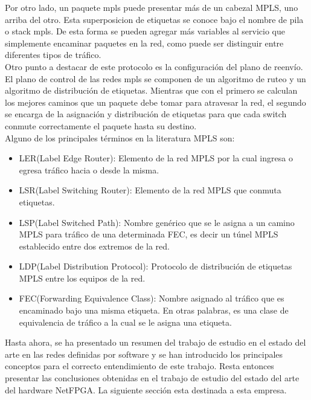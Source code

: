 Por otro lado, un paquete mpls puede presentar más de un cabezal MPLS, uno arriba del otro. Esta superposicion de etiquetas se conoce bajo el nombre de pila o stack mpls. De esta forma se pueden agregar más variables al servicio que simplemente encaminar paquetes en la red, como puede ser distinguir entre diferentes tipos de tráfico.\\

Otro punto a destacar de este protocolo es la configuración del plano de reenvío. El plano de control de las redes mpls se componen de un algoritmo de ruteo y un algoritmo de distribución de etiquetas. Mientras que con el primero se calculan los mejores caminos que un paquete debe tomar para atravesar la red, el segundo se encarga de la asignación y distribución de etiquetas para que cada switch conmute correctamente el paquete hasta su destino.\\

Alguno de los principales términos en la literatura MPLS son:

\begin{itemize}
\item LER(Label Edge Router): Elemento de la red MPLS por la cual ingresa o egresa tráfico hacia o desde la misma.
\item LSR(Label Switching Router): Elemento de la red MPLS que conmuta etiquetas.
\item LSP(Label Switched Path): Nombre genérico que se le asigna a un camino MPLS para tráfico de una determinada FEC, es decir un túnel MPLS establecido entre dos extremos de la red.
\item LDP(Label Distribution Protocol): Protocolo de distribución de etiquetas MPLS entre los equipos de la red.
\item FEC(Forwarding Equivalence Class): Nombre asignado al tráfico que es encaminado bajo una misma etiqueta. En otras palabras, es una clase de equivalencia de tráfico a la cual se le asigna una etiqueta.
 
\end{itemize}
\vspace{1cm}

Hasta ahora, se ha presentado un resumen del trabajo de estudio en el estado del arte en las redes definidas por software y se han introducido los principales conceptos para el correcto entendimiento de este trabajo. Resta entonces presentar las conclusiones obtenidas en el trabajo de estudio del estado del arte del hardware NetFPGA. La siguiente secci\'on esta destinada a esta empresa.

